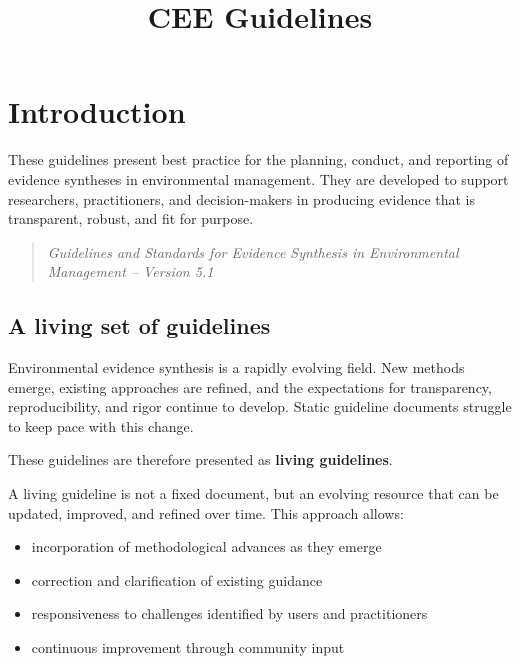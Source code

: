 \documentclass[
  letterpaper,
  DIV=11,
  numbers=noendperiod]{scrreprt}
\title{CEE Guidelines}
\author{}
\date{}
\providecommand{\tightlist}{%
  \setlength{\itemsep}{0pt}\setlength{\parskip}{0pt}}
\renewcommand*\contentsname{Table of contents}
\newcommand\contentsname{Table of contents}
\begin{document}
\maketitle

\renewcommand*\contentsname{Table of contents}
{
\setcounter{tocdepth}{2}
\tableofcontents
}


\chapter*{Introduction}\label{introduction}


These guidelines present best practice for the planning, conduct, and
reporting of evidence syntheses in environmental management. They are
developed to support researchers, practitioners, and decision-makers in
producing evidence that is transparent, robust, and fit for purpose.

\begin{quote}
\emph{Guidelines and Standards for Evidence Synthesis in Environmental
Management -- Version 5.1}
\end{quote}

\section*{A living set of guidelines}\label{a-living-set-of-guidelines}


Environmental evidence synthesis is a rapidly evolving field. New
methods emerge, existing approaches are refined, and the expectations
for transparency, reproducibility, and rigor continue to develop. Static
guideline documents struggle to keep pace with this change.

These guidelines are therefore presented as \textbf{living guidelines}.

A living guideline is not a fixed document, but an evolving resource
that can be updated, improved, and refined over time. This approach
allows:

\begin{itemize}
\tightlist
\item
  incorporation of methodological advances as they emerge\\
\item
  correction and clarification of existing guidance\\
\item
  responsiveness to challenges identified by users and practitioners\\
\item
  continuous improvement through community input
\end{itemize}
\end{document}
